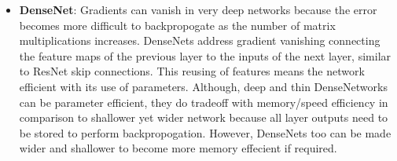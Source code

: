 \begin{itemize}
    \item \textbf{DenseNet}: Gradients can vanish in very deep networks because the error becomes more
          difficult to backpropogate as the number of matrix multiplications increases. DenseNets address
          gradient vanishing connecting the feature maps of the previous layer to the inputs of the next
          layer, similar to ResNet skip connections. This reusing of features means the network efficient
          with its use of parameters. Although, deep and thin DenseNetworks can be parameter efficient, they
          do tradeoff with memory/speed efficiency in comparison to shallower yet wider network because all
          layer outputs need to be stored to perform backpropogation. However, DenseNets too can be made
          wider and shallower to become more memory effecient if required.
\end{itemize}

